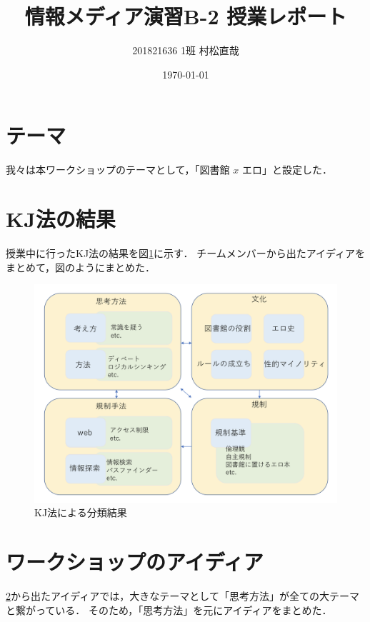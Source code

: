 \documentclass[uplatex,a4paper]{jsarticle}
\title{情報メディア演習B-2 授業レポート}
\author{201821636 1班 村松直哉}
\date{\today}
\begin{document}
\maketitle
%
%
\section{テーマ}
我々は本ワークショップのテーマとして，「図書館 $x$ エロ」と設定した．


\section{KJ法の結果} \label{sec:kj}
授業中に行ったKJ法の結果を図\ref{fig:result}に示す．
チームメンバーから出たアイディアをまとめて，図のようにまとめた．

\begin{figure}[htb]
\begin{center}
    \includegraphics[width=14cm]{figs/result.png}
\end{center}
\caption{KJ法による分類結果}
\label{fig:result}
\end{figure}


\section{ワークショップのアイディア}
\ref{sec:kj}から出たアイディアでは，大きなテーマとして「思考方法」が全ての大テーマと繋がっている．
そのため，「思考方法」を元にアイディアをまとめた．
\end{document}
